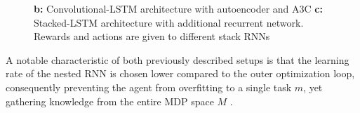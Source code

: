 \documentclass[letterpaper, 10 pt, conference]{ieeeconf}  %
\begin{document}
\begin{figure}[thpb]
        \centering
  \caption{\textbf{b:} Convolutional-LSTM architecture with autoencoder and A3C \newline
        \textbf{c:} Stacked-LSTM architecture with additional recurrent network. Rewards and actions are given to different stack 
        RNNs \cite{wangLearningReinforcementLearn2016}}
        \label{figurelabel}
     \end{figure}
  

A notable characteristic of both previously described setups is that the learning rate of the nested RNN is chosen lower compared 
to the outer optimization loop, consequently preventing
the agent from overfitting to a single task $m$, yet gathering knowledge from the entire MDP space $M$ 
\cite{botvinickReinforcementLearningFast2019}.\newline
\end{document}
